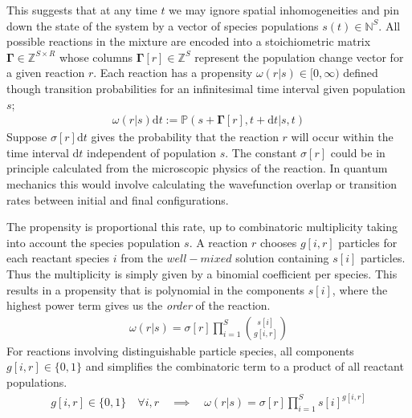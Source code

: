 This suggests that at any time $t$ we may ignore spatial inhomogeneities and pin
down the state of the system by a vector of species populations $s(t)\in\mathbb{N}^S$.
All possible reactions in the mixture are encoded into a stoichiometric matrix
$\mathbf{\Gamma}\in\mathbb{Z}^{S\times R}$ whose columns $\mathbf{\Gamma}[r]\in\mathbb{Z}^{S}$
represent the population change vector for a given reaction $r$. Each reaction
has a propensity $\omega(r|s)\in[0,\infty)$ defined though transition
probabilities for an infinitesimal time interval given population $s$;
\begin{align}
	\omega(r|s)\mathrm{d}t := \mathbb{P}(s+\mathbf{\Gamma}[r],t+\mathrm{d}t|s,t)
	\label{eq:fundamentalpremise}
\end{align}
Suppose $\sigma[r]\mathrm{d}t$ gives the probability that the reaction $r$
will occur within the time interval $\mathrm{d}t$ independent of population
$s$. The constant $\sigma[r]$ could be in principle calculated from the
microscopic physics of the reaction. In quantum mechanics this would involve
calculating the wavefunction overlap or transition rates between initial and
final configurations.

The propensity is proportional this rate, up to combinatoric multiplicity
taking into account the species population $s$. A reaction $r$ chooses $g[i,r]$
particles for each reactant species $i$ from the $well-mixed$ solution containing
$s[i]$ particles. Thus the multiplicity is simply given by a binomial coefficient
per species. This results in a propensity that is polynomial in the components
$s[i]$, where the highest power term gives us the \textit{order} of the reaction.
\begin{align}
	\omega(r|s)=
	\sigma[r]
		\prod_{i=1}^S{s[i] \choose g[i,r]}
	\label{eq:propensity}
\end{align}
For reactions involving distinguishable particle species, all
components $ g[i,r]\in\{ 0,1\}$ and simplifies the combinatoric term to a
product of all reactant populations.
\begin{align}
	g[i,r]\in\{ 0,1\}\quad\forall i,r\quad\implies\quad
	\omega(r|s)=
	\sigma[r]
	\prod_{i=1}^S s[i]^{g[i,r]}
	\label{eq:simplifiedpropensity}
\end{align}
